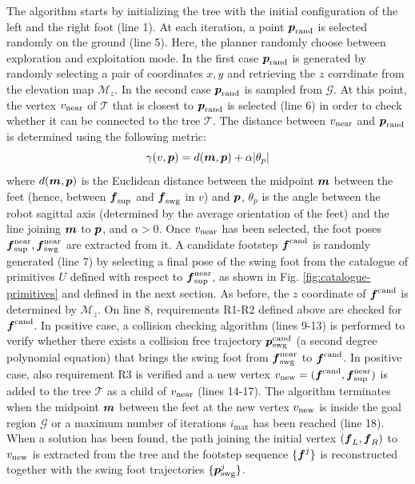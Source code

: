 The algorithm starts by initializing the tree with the initial configuration of 
the left and the right foot (line 1). At each iteration, a point 
${\mbox{\boldmath $p$}}_{\rm {rand}}$ is selected randomly on the ground (line 5). Here, the 
planner randomly choose between exploration and exploitation mode. In the first 
case ${\mbox{\boldmath $p$}}_{\rm {rand}}$ is generated by randomly selecting a pair of 
coordinates $x, y$ and retrieving the $z$ corrdinate from the elevation map 
$\mathcal{M}_z$. In the second case ${\mbox{\boldmath $p$}}_{\rm {rand}}$ is sampled from
$\mathcal{G}$. At this point, the vertex $v_{\rm {near}}$ of $\mathcal{T}$
that is closest to ${\mbox{\boldmath $p$}}_{\rm {rand}}$ is selected (line 6) in order to check
whether it can be connected to the tree $\mathcal{T}$. The distance between
$v_{\rm {near}}$ and ${\mbox{\boldmath $p$}}_{\rm {rand}}$ is determined using the following
metric:
\begin{equation}
  \gamma(v, {\mbox{\boldmath $p$}}) = d({\mbox{\boldmath $m$}}, {\mbox{\boldmath $p$}}) + \alpha |\theta_p|
\end{equation}
where $d({\mbox{\boldmath $m$}}, {\mbox{\boldmath $p$}})$ is the Euclidean distance between the midpoint ${\mbox{\boldmath $m$}}$
between the feet (hence, between ${\mbox{\boldmath $f$}}_{\rm {sup}}$ and ${\mbox{\boldmath $f$}}_{\rm {swg}}$ in
$v$) and ${\mbox{\boldmath $p$}}$, $\theta_p$ is the angle between the robot sagittal axis
(determined by the average orientation of the feet) and 
the line joining ${\mbox{\boldmath $m$}}$ to ${\mbox{\boldmath $p$}}$, and $\alpha>0$. Once $v_{\rm near}$ has been 
selected, the foot poses ${\mbox{\boldmath $f$}}_{\rm sup}^{\rm near}, 
{\mbox{\boldmath $f$}}_{\rm {swg}}^{\rm near}$ are extracted from it. A candidate footstep
${\mbox{\boldmath $f$}}^{\rm cand}$ is randomly generated (line 7) by selecting a final pose of
the swing foot from the catalogue of primitives $U$ defined with respect to 
${\mbox{\boldmath $f$}}_{\rm sup}^{\rm near}$, as shown in Fig. \ref{fig:catalogue-primitives} and 
defined in the next section. As before, the $z$ coordinate of ${\mbox{\boldmath $f$}}^{\rm cand}$
is determined by $\mathcal{M}_z$. On line 8, requirements R1-R2 defined above 
are checked for ${\mbox{\boldmath $f$}}^{\rm cand}$. In positive case, a collision checking 
algorithm (lines 9-13) is performed to verify whether there exists a collision 
free trajectory ${\mbox{\boldmath $p$}}_{\rm swg}^{\rm cand}$ (a second degree polynomial
equation)
that brings the swing foot from 
${\mbox{\boldmath $f$}}_{\rm swg}^{\rm near}$ to ${\mbox{\boldmath $f$}}^{\rm cand}$. In positive case, also 
requirement R3 is verified and a new vertex $v_{\rm new} = ({\mbox{\boldmath $f$}}^{\rm cand}, 
{\mbox{\boldmath $f$}}_{\rm \sup}^{\rm near})$ is added to the tree $\mathcal{T}$ as a child of 
$v_{\rm near}$ (lines 14-17). The algorithm terminates when the midpoint 
${\mbox{\boldmath $m$}}$ between the feet at the new vertex $v_{\rm new}$ is inside the goal 
region $\mathcal{G}$ or a maximum number of iterations $i_{\max}$ has been 
reached (line 18). When a solution has been found, the path joining the 
initial vertex $({\mbox{\boldmath $f$}}_L, {\mbox{\boldmath $f$}}_R)$ to $v_{\rm new}$ is extracted from the tree 
and the footstep sequence $\{{\mbox{\boldmath $f$}}^j\}$ is reconstructed together with the 
swing foot trajectories $\{{\mbox{\boldmath $p$}}_{\rm swg}^j\}$.

